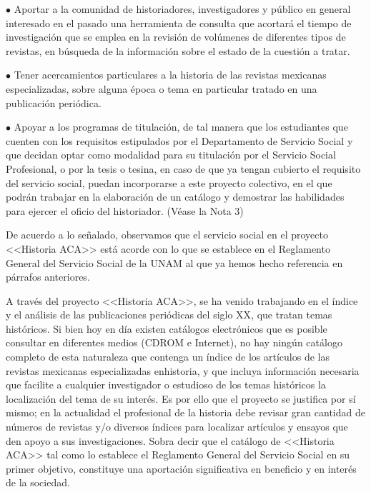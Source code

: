\begin{Obs}
\item[$\bullet$] Aportar a la comunidad de historiadores, investigadores y público en general
interesado en el pasado una herramienta de consulta que acortará el tiempo
de investigación que se emplea en la revisión de volúmenes de diferentes
tipos de revistas, en búsqueda de la información sobre el estado de la
cuestión a tratar.
\item[$\bullet$] Tener acercamientos particulares a la historia de las revistas mexicanas
especializadas, sobre alguna época o tema en particular tratado en una
publicación periódica.
\item[$\bullet$] Apoyar a los programas de titulación, de tal manera que los estudiantes que
cuenten con los requisitos estipulados por el Departamento de Servicio
Social  y que decidan optar como modalidad para su titulación por el
Servicio Social Profesional,  o por la tesis o tesina, en caso de que ya
tengan cubierto el requisito del servicio social, puedan incorporarse a
este proyecto colectivo, en el que podrán trabajar en la elaboración de un
catálogo y demostrar las habilidades para ejercer el oficio del
historiador. (Véase la Nota 3)
\end{Obs}

\medskip
De acuerdo a lo señalado, observamos que el servicio social en el proyecto
<<Historia ACA>> está acorde con lo que se establece en  el Reglamento
General del Servicio Social de la UNAM al que ya hemos hecho referencia en
párrafos anteriores. 

A través del proyecto <<Historia ACA>>, se ha venido trabajando en el índice y
el análisis de las publicaciones periódicas del siglo XX, que tratan temas
históricos. Si bien hoy en día existen catálogos electrónicos que es
posible consultar en diferentes medios (CDROM  e Internet), no
hay ningún catálogo completo de esta naturaleza que contenga un índice de
los artículos de las revistas mexicanas especializadas en\linebreak historia, y que
incluya información necesaria que facilite a cualquier investigador o
estudioso de los temas históricos la localización del tema de su interés.
Es por ello que el proyecto se justifica por sí mismo; en la actualidad el
profesional de la historia debe revisar gran cantidad de números de
revistas y\slash{}o diversos índices para localizar artículos y ensayos que den
apoyo a sus investigaciones. Sobra decir que el catálogo de <<Historia ACA>>
tal como lo establece el Reglamento General del Servicio Social en su
primer objetivo, constituye una aportación significativa en beneficio y en
interés de la sociedad.

